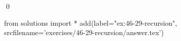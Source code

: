 
\begin{ex}
  \label{ex:46-29-recursion}
  
  \qed
\end{ex}
\begin{python0}
from solutions import *
add(label="ex:46-29-recursion",
    srcfilename='exercises/46-29-recursion/answer.tex')
\end{python0}
